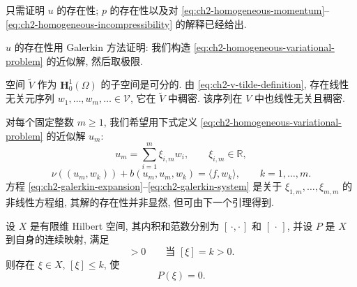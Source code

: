 \begin{Proof}
只需证明 $u$ 的存在性; $p$ 的存在性以及对 \eqref{eq:ch2-homogeneous-momentum}--\eqref{eq:ch2-homogeneous-incompressibility} 的解释已经给出.

$u$ 的存在性用 Galerkin 方法证明: 我们构造 \eqref{eq:ch2-homogeneous-variational-problem} 的近似解, 然后取极限.

空间 $\widetilde V$ 作为 $\mathbf H_0^1(\Omega)$ 的子空间是可分的. 由 \eqref{eq:ch2-v-tilde-definition}, 存在线性无关元序列 $w_1,\ldots,w_m,\ldots\in\mathcal V$, 它在 $\widetilde V$ 中稠密. 该序列在 $V$ 中也线性无关且稠密.

对每个固定整数 $m\geq1$, 我们希望用下式定义 \eqref{eq:ch2-homogeneous-variational-problem} 的近似解 $u_m$:
\begin{equation}
u_m=\sum_{i=1}^{m}\xi_{i,m}w_i,
\qquad \xi_{i,m}\in\mathbb R,
\label{eq:ch2-galerkin-expansion}
\end{equation}
\begin{equation}
\nu((u_m,w_k))+b(u_m,u_m,w_k)=\langle f,w_k\rangle,
\qquad k=1,\ldots,m.
\label{eq:ch2-galerkin-system}
\end{equation}
方程 \eqref{eq:ch2-galerkin-expansion}--\eqref{eq:ch2-galerkin-system} 是关于 $\xi_{1,m},\ldots,\xi_{m,m}$ 的非线性方程组, 其解的存在性并非显然, 但可由下一个引理得到.

\begin{Lemma}
\label{lem:ch2-finite-dimensional-zero}
设 $X$ 是有限维 Hilbert 空间, 其内积和范数分别为 $[\,\cdot,\cdot\,]$ 和 $[\,\cdot\,]$, 并设 $P$ 是 $X$ 到自身的连续映射, 满足
\begin{equation}
[P(\xi),\xi]>0\qquad\text{当 }[\xi]=k>0.
\label{eq:ch2-finite-dimensional-outward-condition}
\end{equation}
则存在 $\xi\in X$, $[\xi]\leq k$, 使
\begin{equation}
P(\xi)=0.
\label{eq:ch2-finite-dimensional-zero}
\end{equation}
\end{Lemma}


\end{Proof}
